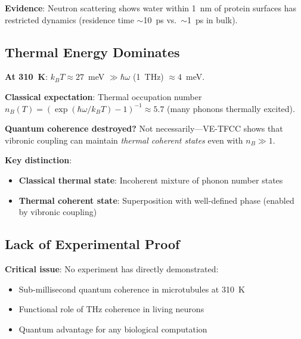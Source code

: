 \textbf{Evidence}: Neutron scattering shows water within 1~nm of protein surfaces has restricted dynamics (residence time $\sim$10~ps vs.~$\sim$1~ps in bulk).

\subsection{Thermal Energy Dominates}\label{thermal-energy-dominates}

\textbf{At 310~K}: $k_B T \approx 27$~meV $\gg \hbar \omega$ (1~THz) $\approx 4$~meV.

\textbf{Classical expectation}: Thermal occupation number $n_B(T) = (\exp(\hbar \omega / k_B T) - 1)^{-1} \approx 5.7$ (many phonons thermally excited).

\textbf{Quantum coherence destroyed?} Not necessarily---VE-TFCC shows that vibronic coupling can maintain \emph{thermal coherent states} even with $n_B \gg 1$.

\textbf{Key distinction}:
\begin{itemize}
\item \textbf{Classical thermal state}: Incoherent mixture of phonon number states
\item \textbf{Thermal coherent state}: Superposition with well-defined phase (enabled by vibronic coupling)
\end{itemize}

\subsection{Lack of Experimental Proof}\label{lack-of-experimental-proof}

\textbf{Critical issue}: No experiment has directly demonstrated:
\begin{itemize}
\item Sub-millisecond quantum coherence in microtubules at 310~K
\item Functional role of THz coherence in living neurons
\item Quantum advantage for any biological computation
\end{itemize}

